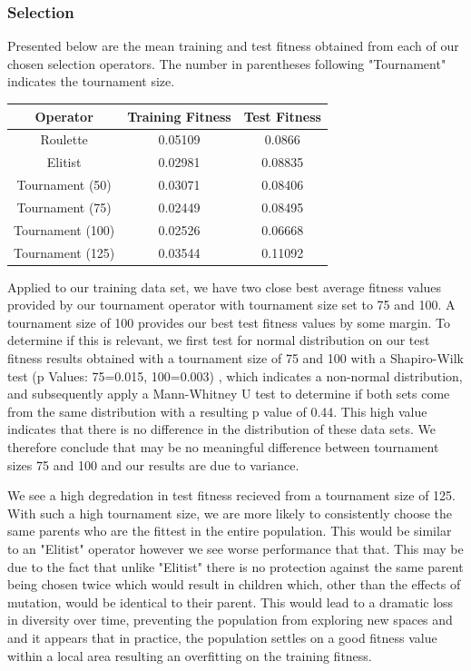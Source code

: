 \documentclass[sigconf]{acmart}
\begin{document}
\subsubsection{Selection}
Presented below are the mean training and test fitness obtained from each of our chosen selection operators. The number in parentheses following "Tournament" indicates the tournament size.
\begin{center}
\begin{tabular} {|c|c|c|}
\hline
Operator & Training Fitness & Test Fitness \\
\hline
Roulette & 0.05109 & 0.0866 \\
Elitist & 0.02981 & 0.08835 \\
Tournament (50) & 0.03071 & 0.08406 \\
Tournament (75) & 0.02449 & 0.08495 \\
Tournament (100) & 0.02526 &  0.06668\\
Tournament (125) & 0.03544 & 0.11092 \\


\hline

\end{tabular}
\end{center}
Applied to our training data set, we have two close best average fitness values provided by our tournament operator with tournament size set to 75 and 100. A tournament size of 100 provides our best test fitness values by some margin. To determine if this is relevant, we first test for normal distribution on our test fitness results obtained with a tournament size of 75 and 100 with a Shapiro-Wilk test (p Values: 75=0.015, 100=0.003) , which indicates a non-normal distribution, and subsequently apply a Mann-Whitney U test to determine if both sets come from the same distribution with a resulting p value of 0.44. This high value indicates that there is no difference in the distribution of these data sets. We therefore conclude that may be no meaningful difference between tournament sizes 75 and 100 and our results are due to variance.

We see a high degredation in test fitness recieved from a tournament size of 125. With such a high tournament size, we are more likely to consistently choose the same parents who are the fittest in the entire population. This would be similar to an "Elitist" operator however we see worse performance that that. This may be due to the fact that unlike "Elitist" there is no protection against the same parent being chosen twice which would result in children which, other than the effects of mutation, would be identical to their parent. This would lead to a dramatic loss in diversity over time, preventing the population from exploring new spaces and and it appears that in practice, the population settles on a good fitness value within a local area resulting an overfitting on the training fitness.
\end{document}

